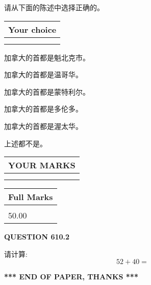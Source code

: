 \documentclass{ctexart}
\begin{document}
  
请从下面的陈述中选择正确的。
  
  
\noindent\hspace{3.0in} \begin{tabular}{|l|}
\hline
Your choice \\
\hline
 \\ 
 \\ 
\hline
\end{tabular}
  
  
 
 
加拿大的首都是魁北克市。
 
 
加拿大的首都是温哥华。
 
 
加拿大的首都是蒙特利尔。
 
 
加拿大的首都是多伦多。
 
 
加拿大的首都是渥太华。
 
 
 上述都不是。
 
 
  
\vspace{0.2in}
  
\noindent\begin{tabular}{|l|}
\hline
 YOUR MARKS  \\
\hline
 \\ 
 \\ 
\hline
\end{tabular}
\hspace{0.05in} \begin{tabular}{|l|}
\hline
 Full Marks  \\
\hline
 \\ 
50.00 \\
\hline
\end{tabular}
{\textbf{\Large{QUESTION
610.2 
}}}
  
  
 
请计算:
\begin{equation}
52 +  %
40 = \nonumber
\end{equation}
 

 

 
   
   
 \vspace{0.2in}
 
   
   
   
   
\vspace{1.0in} 
{\textbf{\large{ *** END OF PAPER, THANKS *** }}} 
   
\end{document}
